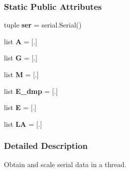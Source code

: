 \subsubsection*{Static Public Attributes}
\begin{DoxyCompactItemize}
\item 
\hypertarget{classserial_thread_1_1_serial_thread_a06ac7a5102243ffa10f9538532e17bae}{tuple {\bfseries ser} = serial.\-Serial()}\label{classserial_thread_1_1_serial_thread_a06ac7a5102243ffa10f9538532e17bae}

\item 
\hypertarget{classserial_thread_1_1_serial_thread_ad48ef789ece6f219e6d91bac001175cd}{list {\bfseries A} = \mbox{[}.\mbox{]}}\label{classserial_thread_1_1_serial_thread_ad48ef789ece6f219e6d91bac001175cd}

\item 
\hypertarget{classserial_thread_1_1_serial_thread_a0756a22c1321ea6074fc90a05089b723}{list {\bfseries G} = \mbox{[}.\mbox{]}}\label{classserial_thread_1_1_serial_thread_a0756a22c1321ea6074fc90a05089b723}

\item 
\hypertarget{classserial_thread_1_1_serial_thread_a42982b906b746f2073e20a1f3ab17c27}{list {\bfseries M} = \mbox{[}.\mbox{]}}\label{classserial_thread_1_1_serial_thread_a42982b906b746f2073e20a1f3ab17c27}

\item 
\hypertarget{classserial_thread_1_1_serial_thread_a894033843b422979db145acd9f0a4419}{list {\bfseries E\-\_\-dmp} = \mbox{[}.\mbox{]}}\label{classserial_thread_1_1_serial_thread_a894033843b422979db145acd9f0a4419}

\item 
\hypertarget{classserial_thread_1_1_serial_thread_a2eea73a30e105d2b9f6b93a2a63d2a05}{list {\bfseries E} = \mbox{[}.\mbox{]}}\label{classserial_thread_1_1_serial_thread_a2eea73a30e105d2b9f6b93a2a63d2a05}

\item 
\hypertarget{classserial_thread_1_1_serial_thread_a58eea22751715d16929ac4f1cf771451}{list {\bfseries L\-A} = \mbox{[}.\mbox{]}}\label{classserial_thread_1_1_serial_thread_a58eea22751715d16929ac4f1cf771451}

\end{DoxyCompactItemize}


\subsubsection{Detailed Description}
Obtain and scale serial data in a thread. 

